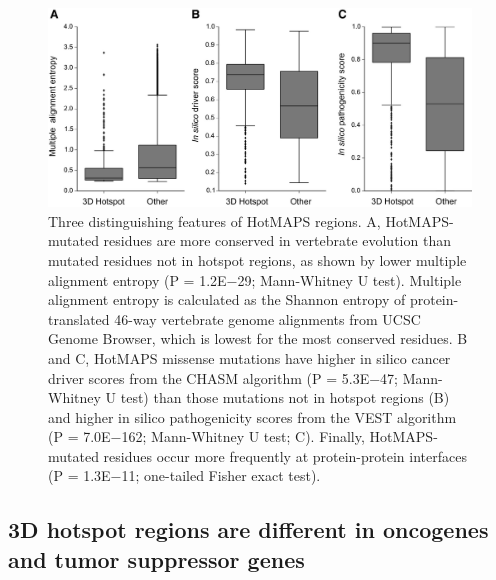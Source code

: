\begin{figure}
  \centering
  \makeatletter
  \let\@currsize\normalsize
  \includegraphics[width=0.9\linewidth]{figures/chapter5/hotspot_properties.jpg}
  \caption[3D hotspot regions are different from other mutated protein residues.]{Three distinguishing features of HotMAPS regions. A, HotMAPS-mutated residues are more conserved in vertebrate evolution than mutated residues not in hotspot regions, as shown by lower multiple alignment entropy (P = 1.2E−29; Mann-Whitney U test). Multiple alignment entropy is calculated as the Shannon entropy of protein-translated 46-way vertebrate genome alignments from UCSC Genome Browser, which is lowest for the most conserved residues. B and C, HotMAPS missense mutations have higher in silico cancer driver scores from the CHASM algorithm (P = 5.3E−47; Mann-Whitney U test) than those mutations not in hotspot regions (B) and higher in silico pathogenicity scores from the VEST algorithm (P = 7.0E−162; Mann-Whitney U test; C). Finally, HotMAPS-mutated residues occur more frequently at protein-protein interfaces (P = 1.3E−11; one-tailed Fisher exact test).}
  \label{fig:hotspot_properties}
\end{figure}

\subsection{3D hotspot regions are different in oncogenes and tumor suppressor genes}

